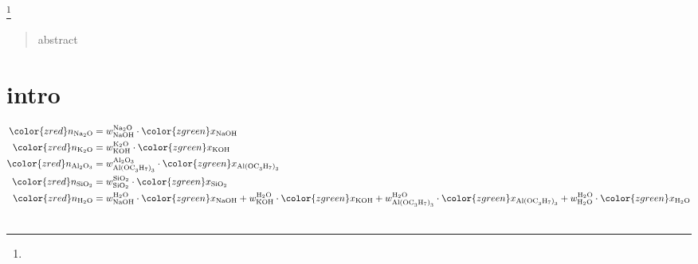 \documentclass[amsmath,
               amssymb,
               superscriptaddress,
               aps,
               floats,
               showkeys,
               notitlepage, %
               ]{revtex4-1}
\begin{document}
\title{}
\thanks{}
\author{\L{}. M. Mentel}

\date{\today}

\begin{abstract}
abstract
\end{abstract}

\maketitle

\section{intro}

\begin{align}\notag
{\color{zred}n_{\textrm{Na}_2\textrm{O}}} &= w^{\textrm{Na}_2\textrm{O}}_{\textrm{NaOH}} \cdot {\color{zgreen}x_{\textrm{NaOH}}} \\ \notag
{\color{zred}n_{\textrm{K}_2\textrm{O}}} &= w^{\textrm{K}_2\textrm{O}}_{\textrm{KOH}} \cdot {\color{zgreen}x_{\textrm{KOH}}} \\ \notag
{\color{zred}n_{\textrm{Al}_{2}\textrm{O}_{3}}} &= w^{\textrm{Al}_{2}\textrm{O}_{3}}_{\textrm{Al(OC}_{3}\textrm{H}_{7}\textrm{)}_{3}} \cdot {\color{zgreen}x_{\textrm{Al(OC}_{3}\textrm{H}_{7}\textrm{)}_{3}}} \\ \notag
{\color{zred}n_{\textrm{SiO}_{2}}} &= w^{\textrm{SiO}_{2}}_{\textrm{SiO}_{2}} \cdot {\color{zgreen}x_{\textrm{SiO}_{2}}} \\ \notag
{\color{zred}n_{\textrm{H}_2\textrm{O}}} &= 
w^{\textrm{H}_2\textrm{O}}_{\textrm{NaOH}} \cdot {\color{zgreen}x_{\textrm{NaOH}}}
+ w^{\textrm{H}_2\textrm{O}}_{\textrm{KOH}} \cdot {\color{zgreen}x_{\textrm{KOH}}}
+ w^{\textrm{H}_{2}\textrm{O}}_{\textrm{Al(OC}_{3}\textrm{H}_{7}\textrm{)}_{3}} \cdot {\color{zgreen}x_{\textrm{Al(OC}_{3}\textrm{H}_{7}\textrm{)}_{3}}}
+ w^{\textrm{H}_2\textrm{O}}_{\textrm{H}_2\textrm{O}} \cdot {\color{zgreen}x_{\textrm{H}_2\textrm{O}}}  \\ \notag
\end{align}
\end{document}
